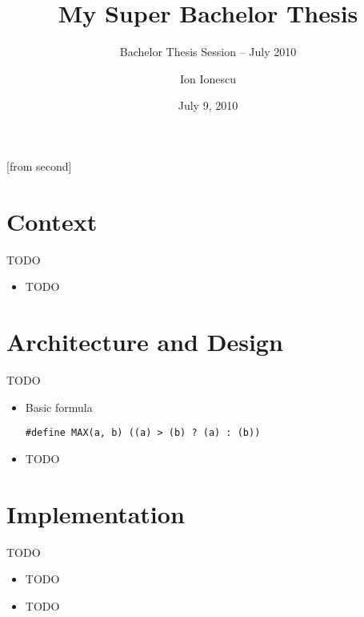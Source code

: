 \documentclass{beamer}
\title[My Super Bachelor Thesis]{My Super Bachelor Thesis}
\subtitle{Bachelor Thesis Session -- July 2010}
\institute{Automatic Control and Computers Faculty\\
	University ``Politehnica'' of Bucharest}
\author[Ion Ionescu]{Ion Ionescu}
\date{July 9, 2010}
\begin{document}
[from second]


\frame{\titlepage}

\frame{\tableofcontents}

\section{Context}

\begin{frame}{TODO}
	\begin{itemize}		%
		\item TODO
	\end{itemize}
\end{frame}

\section{Architecture and Design}

\begin{frame}{TODO}
	\begin{itemize}
		\item Basic formula
			\begin{beamerboxesrounded}[lower=block body,shadow=true]{}
				\texttt{\#define MAX(a, b)   ((a) > (b) ? (a) : (b))}
			\end{beamerboxesrounded}
		\item TODO
	\end{itemize}
\end{frame}

\section{Implementation}

\begin{frame}{TODO}
	\begin{itemize}
		\item TODO
		\item TODO
	\end{itemize}
\end{frame}
\end{document}
